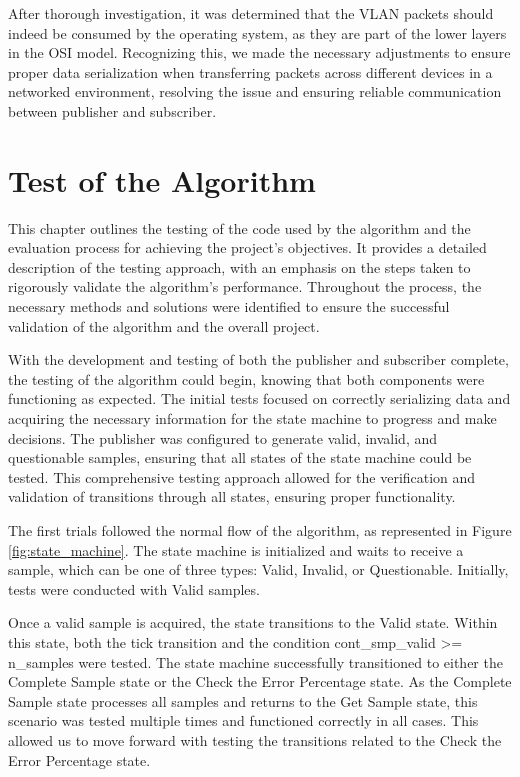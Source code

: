 After thorough investigation, it was determined that the VLAN packets should indeed be consumed by the operating system, as they are part of the lower layers in the OSI model. Recognizing this, we made the necessary adjustments to ensure proper data serialization when transferring packets across different devices in a networked environment, resolving the issue and ensuring reliable communication between publisher and subscriber.

\section{Test of the Algorithm}

This chapter outlines the testing of the code used by the algorithm and the evaluation process for achieving the project’s objectives. It provides a detailed description of the testing approach, with an emphasis on the steps taken to rigorously validate the algorithm's performance. Throughout the process, the necessary methods and solutions were identified to ensure the successful validation of the algorithm and the overall project.

With the development and testing of both the publisher and subscriber complete, the testing of the algorithm could begin, knowing that both components were functioning as expected. The initial tests focused on correctly serializing data and acquiring the necessary information for the state machine to progress and make decisions. The publisher was configured to generate valid, invalid, and questionable samples, ensuring that all states of the state machine could be tested. This comprehensive testing approach allowed for the verification and validation of transitions through all states, ensuring proper functionality.

The first trials followed the normal flow of the algorithm, as represented in Figure \ref{fig:state_machine}. The state machine is initialized and waits to receive a sample, which can be one of three types: Valid, Invalid, or Questionable. Initially, tests were conducted with Valid samples.

Once a valid sample is acquired, the state transitions to the Valid state. Within this state, both the tick transition and the condition cont\_smp\_valid >= n\_samples were tested. The state machine successfully transitioned to either the Complete Sample state or the Check the Error Percentage state. As the Complete Sample state processes all samples and returns to the Get Sample state, this scenario was tested multiple times and functioned correctly in all cases. This allowed us to move forward with testing the transitions related to the Check the Error Percentage state.

